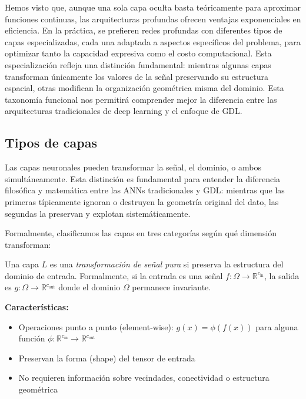 Hemos visto que, aunque una sola capa oculta basta teóricamente para aproximar funciones continuas, las arquitecturas profundas ofrecen ventajas exponenciales en eficiencia. En la práctica, se prefieren redes profundas con diferentes tipos de capas especializadas, cada una adaptada a aspectos específicos del problema, para optimizar tanto la capacidad expresiva como el costo computacional. Esta especialización refleja una distinción fundamental: mientras algunas capas transforman únicamente los valores de la señal preservando su estructura espacial, otras modifican la organización geométrica misma del dominio. Esta taxonomía funcional nos permitirá comprender mejor la diferencia entre las arquitecturas tradicionales de deep learning y el enfoque de \gls{GDL}.

\subsection{Tipos de capas}\label{subsec:tipos_de_capas}

Las capas neuronales pueden transformar la señal, el dominio, o ambos simultáneamente. Esta distinción es fundamental para entender la diferencia filosófica y matemática entre las \glspl{ANN} tradicionales y \gls{GDL}: mientras que las primeras típicamente ignoran o destruyen la geometría original del dato, las segundas la preservan y explotan sistemáticamente.

Formalmente, clasificamos las capas en tres categorías según qué dimensión transforman:

\begin{definition}\label{def:signal_transform}
	Una capa $L$ es una \textit{transformación de señal pura} si preserva la estructura del dominio de entrada. Formalmente, si la entrada es una señal $f: \Omega \to \mathbb{R}^{c_{\text{in}}}$, la salida es $g: \Omega \to \mathbb{R}^{c_{\text{out}}}$ donde el dominio $\Omega$ permanece invariante.

	\textbf{Características:}
	\begin{itemize}
		\item Operaciones punto a punto (element-wise): $g(x) = \phi(f(x))$ para alguna función $\phi: \mathbb{R}^{c_{\text{in}}} \to \mathbb{R}^{c_{\text{out}}}$
		\item Preservan la forma (shape) del tensor de entrada
		\item No requieren información sobre vecindades, conectividad o estructura geométrica
	\end{itemize}
\end{definition}

